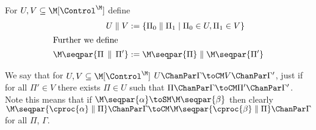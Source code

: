 For $U, V \subseteq \M[\Control^\M]$ define
\begin{align*}
U \parallel V &:= \{\Pi_0 \parallel \Pi_1 \mid \Pi_0 \in U, \Pi_1 \in V\}\\
\intertext{Further we define}
\M\seqpar{\Pi \,\parallel\, \Pi'} &:= \M\seqpar{\Pi} \parallel \M\seqpar{\Pi'}
\end{align*}

We say that for $U, V \subseteq \M[\Control^\M]$ $U \ChanPar \Gamma \toCM V \ChanPar \Gamma'$, just if for all $\Pi' \in V$ there exists $\Pi \in U$ such that $\Pi \ChanPar \Gamma \toCM \Pi' \ChanPar \Gamma'$. Note this means that if $\M\seqpar{\alpha} \toSM \M\seqpar{\beta}$ then clearly $\M\seqpar{\cproc{\alpha} \parallel \Pi} \ChanPar \Gamma \toCM \M\seqpar{\cproc{\beta} \parallel \Pi} \ChanPar \Gamma$ for all $\Pi$, $\Gamma$.

